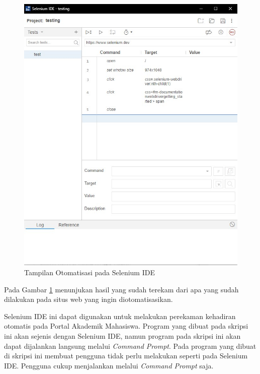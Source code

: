 \begin{enumerate}
\begin{figure}[H]
			\includegraphics[scale=0.4]{Gambar/testing.jpg}
			\caption{Tampilan Otomatisasi pada Selenium IDE} 
			\label{fig:testing}
		\end{figure}
		Pada Gambar \ref{fig:testing} menunjukan hasil yang sudah terekam dari apa yang sudah dilakukan pada situs web yang ingin diotomatisasikan.
	\end{enumerate}
Selenium IDE ini dapat digunakan untuk melakukan perekaman kehadiran otomatis pada Portal Akademik Mahasiswa. Program yang dibuat pada skripsi ini akan sejenis dengan Selenium IDE, namun program pada skripsi ini akan dapat dijalankan langsung melalui \textit{Command Prompt}. Pada program yang dibuat di skripsi ini membuat pengguna tidak perlu melakukan seperti pada Selenium IDE. Pengguna cukup menjalankan melalui \textit{Command Prompt} saja.